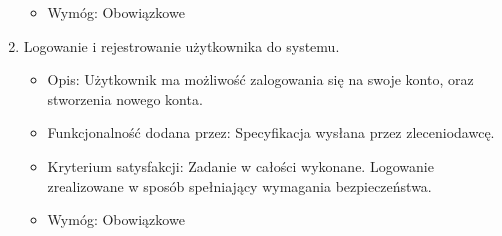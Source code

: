 \documentclass{article}
\begin{document}
\begin{enumerate}
\begin{itemize}
\item Wymóg: Obowiązkowe
\end{itemize}
\item Logowanie i rejestrowanie użytkownika do systemu.
\begin{itemize}
\item Opis: Użytkownik ma możliwość zalogowania się na swoje konto, oraz stworzenia nowego konta.
\item Funkcjonalność dodana przez: Specyfikacja wysłana przez zleceniodawcę.
\item Kryterium satysfakcji: Zadanie w całości wykonane. Logowanie zrealizowane w sposób spełniający wymagania bezpieczeństwa.
\item Wymóg: Obowiązkowe
\end{itemize}
\end{enumerate}
\end{document}
